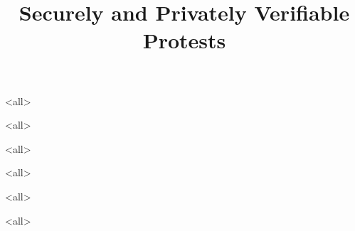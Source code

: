 \title{%
  Securely and Privately Verifiable Protests
}

\maketitle

\mode*

\begin{abstract}
  
\end{abstract}

\clearpage
\tableofcontents
\clearpage

\mode<all>


\mode<all>


\mode<all>

\mode<all>


%

\mode<all>

\mode<all>




\begin{frame}[allowframebreaks]
  \printbibliography{}
\end{frame}
